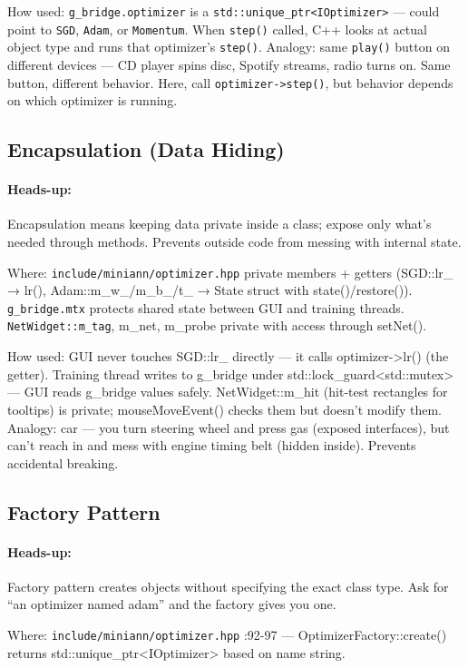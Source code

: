 \documentclass[12pt]{article}
\begin{document}
How used: \texttt{g\_bridge.optimizer} is a \texttt{std::unique\_ptr<IOptimizer>} — could point to \texttt{SGD}, \texttt{Adam}, or \texttt{Momentum}. When \texttt{step()} called, C++ looks at actual object type and runs that optimizer's \texttt{step()}. Analogy: same \texttt{play()} button on different devices — CD player spins disc, Spotify streams, radio turns on. Same button, different behavior. Here, call \texttt{optimizer->step()}, but behavior depends on which optimizer is running.

\subsection{Encapsulation (Data Hiding)}
\paragraph{Heads-up:} Encapsulation means keeping data private inside a class; expose only what's needed through methods. Prevents outside code from messing with internal state.

Where: \texttt{include/miniann/optimizer.hpp} private members + getters (SGD::lr\_ → lr(), Adam::m\_w\_/m\_b\_/t\_ → State struct with state()/restore()). \texttt{g\_bridge.mtx} protects shared state between GUI and training threads. \texttt{NetWidget::m\_tag}, m\_net, m\_probe private with access through setNet().

How used: GUI never touches SGD::lr\_ directly — it calls optimizer->lr() (the getter). Training thread writes to g\_bridge under std::lock\_guard<std::mutex> — GUI reads g\_bridge values safely. NetWidget::m\_hit (hit-test rectangles for tooltips) is private; mouseMoveEvent() checks them but doesn't modify them. Analogy: car — you turn steering wheel and press gas (exposed interfaces), but can't reach in and mess with engine timing belt (hidden inside). Prevents accidental breaking.

\subsection{Factory Pattern}
\paragraph{Heads-up:} Factory pattern creates objects without specifying the exact class type. Ask for ``an optimizer named adam'' and the factory gives you one.

Where: \texttt{include/miniann/optimizer.hpp} :92-97 — OptimizerFactory::create() returns std::unique\_ptr<IOptimizer> based on name string.
\end{document}
